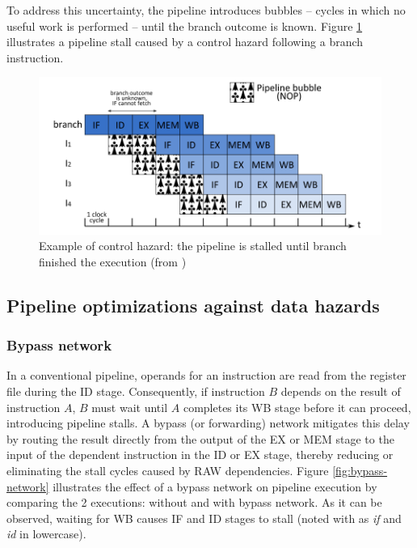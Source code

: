 To address this uncertainty, the pipeline introduces bubbles -- cycles in which no useful work is performed -- until the branch outcome is known. Figure \ref{fig:bubbles} illustrates a pipeline stall caused by a control hazard following a branch instruction.

\begin{figure}[H]
    \includegraphics[width=\textwidth]{figures/pipeline-bubbles.png}
    \caption{Example of control hazard: the pipeline is stalled until branch finished the execution (from \cite{perais_increasing_2016})}
    \label{fig:bubbles}
\end{figure}

\subsection{Pipeline optimizations against data hazards}

\subsubsection{Bypass network}

In a conventional pipeline, operands for an instruction are read from the register file during the ID stage. Consequently, if instruction $B$ depends on the result of instruction $A$, $B$ must wait until $A$ completes its WB stage before it can proceed, introducing pipeline stalls. A bypass (or forwarding) network mitigates this delay by routing the result directly from the output of the EX or MEM stage to the input of the dependent instruction in the ID or EX stage, thereby reducing or eliminating the stall cycles caused by RAW dependencies. Figure \ref{fig:bypass-network} illustrates the effect of a bypass network on pipeline execution by comparing the 2 executions: without and with bypass network. As it can be observed, waiting for WB causes IF and ID stages to stall (noted with as \textit{if} and \textit{id} in lowercase).

